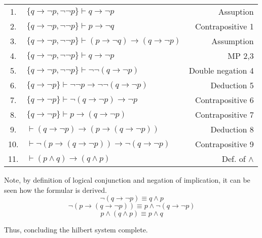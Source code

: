 \begin{tabular}{ clr }
    1. & $\{q \to \neg p, \neg \neg p\} \vdash q \to \neg p$ & Assuption \\
    2. & $\{q \to \neg p, \neg \neg p\} \vdash p \to \neg q$ & Contrapositive 1 \\
    3. & $\{q \to \neg p, \neg \neg p\} \vdash (p \to \neg q) \to (q \to \neg p)$ & Assumption \\
    4. & $\{q \to \neg p, \neg \neg p\} \vdash q \to \neg p$ & MP 2,3 \\
    5. & $\{q \to \neg p, \neg \neg p\} \vdash \neg \neg(q \to \neg p)$ & Double negation 4 \\
    6. & $\{q \to \neg p\} \vdash \neg \neg p \to \neg \neg(q \to \neg p)$ & Deduction 5 \\
    7. & $\{q \to \neg p\} \vdash \neg(q \to \neg p) \to \neg p$ & Contrapositive 6 \\
    8. & $\{q \to \neg p\} \vdash p \to (q \to \neg p)$ & Contrapositive 7 \\
    9. & $\vdash (q \to \neg p) \to (p \to (q \to \neg p))$ & Deduction 8 \\
    10. & $\vdash  \neg (p \to (q \to \neg p)) \to \neg (q \to \neg p) $ & Contrapositive 9 \\
    11. & $\vdash (p \land q) \to (q \land p)$ & Def. of $\land$ 
\end{tabular}

Note, by definition of logical conjunction and negation of implication, it can be seen how the formular is derived.
$$\neg (q \to \neg p) \equiv q \land p $$
$$\neg (p \to (q \to \neg p)) \equiv p \land \neg (q \to \neg p)$$
$$p \land (q \land p) \equiv p \land q$$

Thus, concluding the hilbert system complete.
